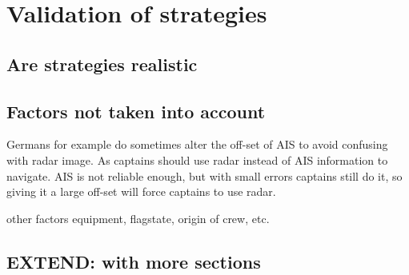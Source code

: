 \chapter{Validation of strategies}

\section{Are strategies realistic}

\section{Factors not taken into account}
Germans for example do sometimes alter the off-set of AIS to avoid confusing with radar image. As captains should use radar instead of AIS information to navigate. AIS is not reliable enough, but with small errors captains still do it, so giving it a large off-set will force captains to use radar.

other factors equipment, flagstate, origin of crew, etc.

\section{EXTEND: with more sections}